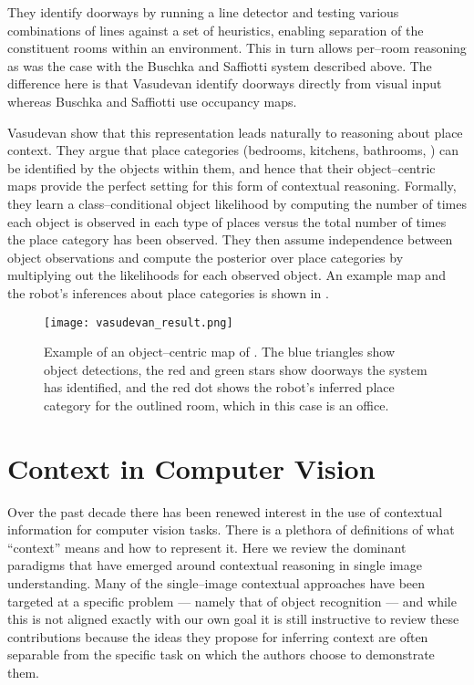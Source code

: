 They identify doorways by running a line detector and testing various
combinations of lines against a set of heuristics, enabling separation
of the constituent rooms within an environment. This in turn allows
per--room reasoning as was the case with the Buschka and Saffiotti
system described above. The difference here is that Vasudevan \etal
identify doorways directly from visual input whereas Buschka and
Saffiotti use occupancy maps.

Vasudevan \etal show that this representation leads naturally to
reasoning about place context. They argue that place categories
(bedrooms, kitchens, bathrooms, \etc) can be identified by the objects
within them, and hence that their object--centric maps provide the
perfect setting for this form of contextual reasoning. Formally, they
learn a class--conditional object likelihood by computing the number
of times each object is observed in each type of places versus the
total number of times the place category has been observed. They then
assume independence between object observations and compute the
posterior over place categories by multiplying out the likelihoods for
each observed object. An example map and the robot's inferences about
place categories is shown in .

\begin{figure}[htp]
\centering
\texttt{[image: vasudevan\_result.png]}
\caption{Example of an object--centric map of \cite{Vasudevan07}. The
  blue triangles show object detections, the red and green stars show
  doorways the system has identified, and the red dot shows the
  robot's inferred place category for the outlined room, which in this
  case is an office.}
\label{fig:vasudevan-result}
\end{figure}






\section{Context in Computer Vision}
Over the past decade there has been renewed interest in the use of
contextual information for computer vision tasks. There is a plethora
of definitions of what ``context'' means and how to represent it. Here
we review the dominant paradigms that have emerged around contextual
reasoning in single image understanding. Many of the single--image
contextual approaches have been targeted at a specific problem ---
namely that of object recognition --- and while this is not aligned
exactly with our own goal it is still instructive to review these
contributions because the ideas they propose for inferring context are
often separable from the specific task on which the authors choose to
demonstrate them.

